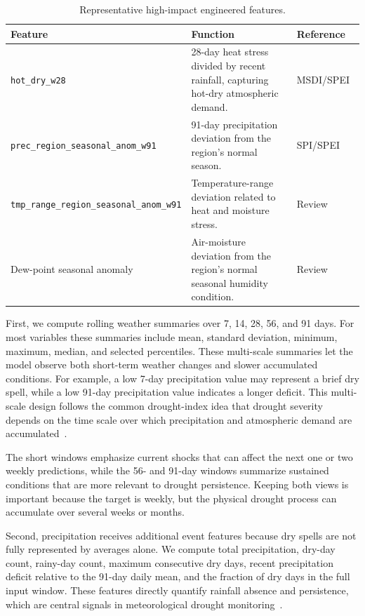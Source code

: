 \documentclass[conference]{IEEEtran}
\begin{document}
\begin{table}[t]
\centering
\caption{Representative high-impact engineered features.}
\label{tab:core_features}
\renewcommand{\arraystretch}{1.3}
\begin{tabular}{p{}p{}p{}}
\toprule
Feature & Function & Reference \\
\midrule
\texttt{hot\_dry\_w28} & 28-day heat stress divided by recent rainfall,
capturing hot-dry atmospheric demand. & MSDI/SPEI~\cite{hao2013msdi,
vicente2010spei} \\
\addlinespace
\texttt{prec\_region\_}\newline\texttt{seasonal\_anom\_w91} & 91-day
precipitation deviation from the region's normal season. & SPI/SPEI~\cite{mckee1993spi,
vicente2010spei} \\
\addlinespace
\texttt{tmp\_range\_region\_}\newline\texttt{seasonal\_anom\_w91} &
Temperature-range deviation related to heat and moisture stress. &
Review~\cite{mishra2010review} \\
Dew-point seasonal anomaly & Air-moisture deviation from the region's normal
seasonal humidity condition. & Review~\cite{mishra2010review} \\
\bottomrule
\end{tabular}
\end{table}

First, we compute rolling weather summaries over 7, 14, 28, 56, and 91 days.
For most variables these summaries include mean, standard deviation, minimum,
maximum, median, and selected percentiles. These multi-scale summaries let the
model observe both short-term weather changes and slower accumulated conditions.
For example, a low 7-day precipitation value may represent a brief dry spell,
while a low 91-day precipitation value indicates a longer deficit. This
multi-scale design follows the common drought-index idea that drought severity
depends on the time scale over which precipitation and atmospheric demand are
accumulated~\cite{mckee1993spi,vicente2010spei}.

The short windows emphasize current shocks that can affect the next one or two
weekly predictions, while the 56- and 91-day windows summarize sustained
conditions that are more relevant to drought persistence. Keeping both views is
important because the target is weekly, but the physical drought process can
accumulate over several weeks or months.

Second, precipitation receives additional event features because dry spells are
not fully represented by averages alone. We compute total precipitation,
dry-day count, rainy-day count, maximum consecutive dry days, recent
precipitation deficit relative to the 91-day daily mean, and the fraction of dry
days in the full input window. These features directly quantify rainfall
absence and persistence, which are central signals in meteorological drought
monitoring~\cite{mckee1993spi,mishra2010review}.
\end{document}
